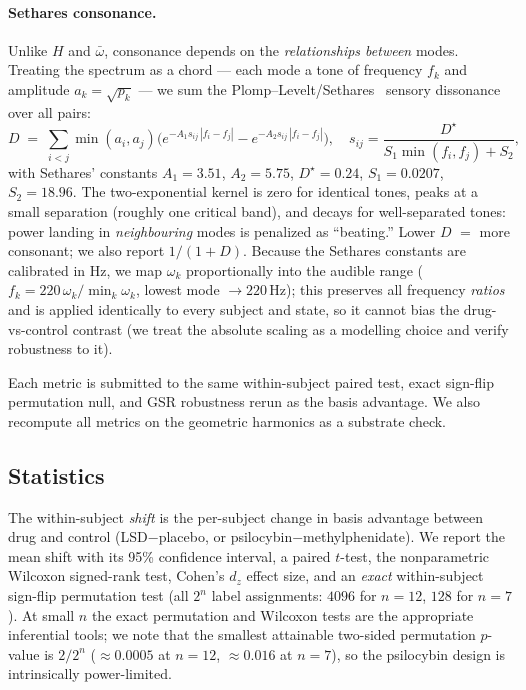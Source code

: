 \documentclass[10pt,a4paper]{article}
\begin{document}
\paragraph{Sethares consonance.} Unlike $H$ and $\bar\omega$, consonance depends on
the \emph{relationships between} modes. Treating the spectrum as a chord --- each
mode a tone of frequency $f_k$ and amplitude $a_k=\sqrt{p_k}$ --- we sum the
Plomp--Levelt/Sethares~\cite{sethares1993} sensory dissonance over all pairs:
\begin{equation}
D \;=\; \sum_{i<j} \min(a_i,a_j)\Big(e^{-A_1 s_{ij}\,|f_i-f_j|}
                                    - e^{-A_2 s_{ij}\,|f_i-f_j|}\Big),
\quad s_{ij}=\frac{D^\star}{S_1\min(f_i,f_j)+S_2},
\end{equation}
with Sethares' constants $A_1=3.51$, $A_2=5.75$, $D^\star=0.24$, $S_1=0.0207$,
$S_2=18.96$. The two-exponential kernel is zero for identical tones, peaks at a
small separation (roughly one critical band), and decays for well-separated tones:
power landing in \emph{neighbouring} modes is penalized as ``beating.'' Lower $D$
$=$ more consonant; we also report $1/(1+D)$. Because the Sethares constants are
calibrated in Hz, we map $\omega_k$ proportionally into the audible range
($f_k = 220\,\omega_k/\min_k\omega_k$, lowest mode $\to220$\,Hz); this preserves
all frequency \emph{ratios} and is applied identically to every subject and state,
so it cannot bias the drug-vs-control contrast (we treat the absolute scaling as a
modelling choice and verify robustness to it).

Each metric is submitted to the same within-subject paired test, exact sign-flip
permutation null, and GSR robustness rerun as the basis advantage. We also
recompute all metrics on the geometric harmonics as a substrate check.

\subsection{Statistics}
The within-subject \emph{shift} is the per-subject change in basis advantage
between drug and control (LSD$-$placebo, or psilocybin$-$methylphenidate). We
report the mean shift with its 95\% confidence interval, a paired $t$-test, the
nonparametric Wilcoxon signed-rank test, Cohen's $d_z$ effect size, and an
\emph{exact} within-subject sign-flip permutation test (all $2^n$ label
assignments: $4096$ for $n=12$, $128$ for $n=7$). At small $n$ the exact
permutation and Wilcoxon tests are the appropriate inferential tools; we note
that the smallest attainable two-sided permutation $p$-value is $2/2^n$
($\approx 0.0005$ at $n=12$, $\approx 0.016$ at $n=7$), so the psilocybin design
is intrinsically power-limited.
\end{document}
